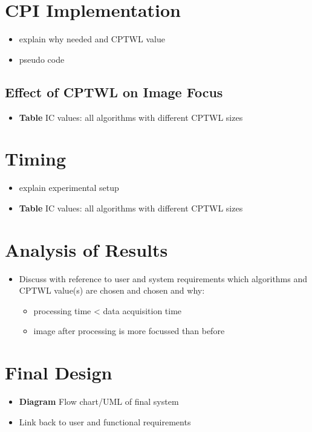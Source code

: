 \documentclass[class=report,11pt,crop=false]{standalone}
\begin{document}
\section{CPI Implementation}
\begin{itemize}
    \item explain why needed and CPTWL value
    \item pseudo code
\end{itemize}
\subsection{Effect of CPTWL on Image Focus}
\begin{itemize}
    \item \textbf{Table} IC values: all algorithms with different CPTWL sizes
\end{itemize}

\section{Timing}
\begin{itemize}
    \item explain experimental setup
    \item \textbf{Table} IC values: all algorithms with different CPTWL sizes
\end{itemize}


\section{Analysis of Results}
\begin{itemize}
    \item Discuss with reference to user and system requirements which algorithms and CPTWL value(s) are chosen and chosen and why:
    \begin{itemize}
        \item processing time < data acquisition time
        \item image after processing is more focussed than before
    \end{itemize}
\end{itemize} 

\section{Final Design}
\begin{itemize}
    \item \textbf{Diagram} Flow chart/UML of final system
    \item Link back to user and functional requirements
\end{itemize}
\end{document}
